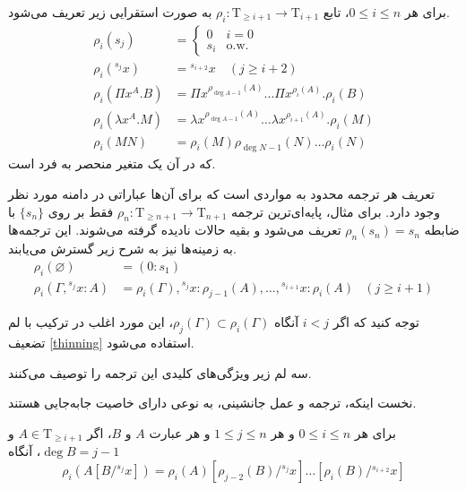 \begin{defn}
برای هر
$0 \le i \le n$،
تابع
$\rho_i : \mathrm{T}_{\ge i+1} \to \mathrm{T}_{i+1}$
به صورت استقرایی زیر تعریف می‌شود.
\begin{align*}
\rho_i(s_j) &= 
    \begin{cases}
        0 &i = 0\\
        s_i &\text{o.w.}
    \end{cases}\\
\rho_i({}^{s_j}x) &= {}^{s_{i+2}}x \quad (j \ge i+2)\\
\rho_i(\Pi x^A.B) &= \Pi x^{\rho_{\operatorname{deg} A-1}(A)} \dots \Pi x^{\rho_{i}(A)}.\rho_i(B)\\
\rho_i(\lambda x^A.M) &= \lambda x^{\rho_{\operatorname{deg} A-1}(A)} \dots \lambda x^{\rho_{i+1}(A)}.\rho_i(M)\\
\rho_i(MN) &= \rho_i(M) \rho_{\operatorname{deg} N-1}(N) \dots \rho_i(N)
\end{align*}
که در آن
یک متغیر منحصر به فرد است.

تعریف هر ترجمه محدود به مواردی است که برای آن‌ها عباراتی در دامنه مورد نظر وجود دارد. برای مثال، پایه‌ای‌ترین ترجمه
$\rho_n : \mathrm{T}_{\ge n+1} \to \mathrm{T}_{n+1}$
فقط بر روی
$\{s_n\}$
با ضابطه
$\rho_n(s_n) = s_n$
تعریف می‌شود و بقیه حالات نادیده گرفته می‌شوند. این ترجمه‌ها به زمینه‌ها نیز به شرح زیر گسترش می‌یابند.
\begin{align*}
\rho_i(\varnothing) &= (0 : s_1)\\
\rho_i(\Gamma,{}^{s_{j}}x:A) &= \rho_i(\Gamma), {}^{s_{j}}x:\rho_{j-1}(A), \dots, {}^{s_{i+1}}x:\rho_{i}(A) &(j \ge i+1)
\end{align*}
\end{defn}

توجه کنید که اگر
$i < j$
آنگاه
$\rho_j(\Gamma) \subset \rho_i(\Gamma)$،
این مورد اغلب در ترکیب با لم تضعیف
\ref{thinning}
استفاده می‌شود.

سه لم زیر ویژگی‌های کلیدی این ترجمه را توصیف می‌کنند.

نخست اینکه، ترجمه و عمل جانشینی، به نوعی دارای خاصیت جابه‌جایی هستند.

\begin{lmm}\label{rho_commutes_subst}
برای هر
$0 \le i \le n$
و هر
$1 \le j \le n$
و هر عبارت
$A$ و $B$،
اگر
$A \in \mathrm{T}_{\ge i+1}$ و $\operatorname{deg} B = j-1$، آنگاه
\begin{equation*}
\rho_i(A[B/{}^{s_j}x]) = \rho_i(A)[\rho_{j-2}(B)/{}^{s_j}x] \dots [\rho_{i}(B)/{}^{s_{i+2}}x]
\end{equation*}
\end{lmm}

